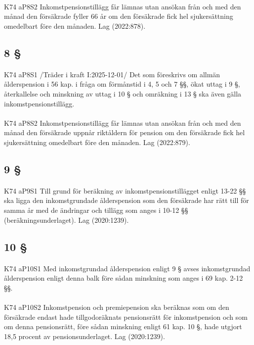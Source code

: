 \documentclass[a4paper,notitlepage,openany,10pt]{book}
\begin{document}
\paragraph*{}
{\tiny K74 aP8S2}
Inkomstpensionstillägg får lämnas utan ansökan från och med den månad den försäkrade fyller 66 år om den försäkrade fick hel sjukersättning omedelbart före den månaden.
Lag (2022:878).
\subsection*{8 §}
\paragraph*{}
{\tiny K74 aP8S1}
/Träder i kraft I:2025-12-01/
Det som föreskrivs om allmän ålderspension i 56 kap. i fråga om förmånstid i 4, 5 och 7 §§, ökat uttag i 9 §, återkallelse och minskning av uttag i 10 § och omräkning i 13 § ska även gälla inkomstpensionstillägg.
\paragraph*{}
{\tiny K74 aP8S2}
Inkomstpensionstillägg får lämnas utan ansökan från och med den månad den försäkrade uppnår riktåldern för pension om den försäkrade fick hel sjukersättning omedelbart före den månaden.
Lag (2022:879).
\subsection*{9 §}
\paragraph*{}
{\tiny K74 aP9S1}
Till grund för beräkning av inkomstpensionstillägget enligt 13-22 §§ ska ligga den inkomstgrundade ålderspension som den försäkrade har rätt till för samma år med de ändringar och tillägg som anges i 10-12 §§ (beräkningsunderlaget).
Lag (2020:1239).
\subsection*{10 §}
\paragraph*{}
{\tiny K74 aP10S1}
Med inkomstgrundad ålderspension enligt 9 § avses inkomstgrundad ålderspension enligt denna balk före sådan minskning som anges i 69 kap. 2-12 §§.
\paragraph*{}
{\tiny K74 aP10S2}
Inkomstpension och premiepension ska beräknas som om den försäkrade endast hade tillgodoräknats pensionsrätt för inkomstpension och som om denna pensionsrätt, före sådan minskning enligt 61 kap. 10 §, hade utgjort 18,5 procent av pensionsunderlaget.
Lag (2020:1239).
\end{document}
